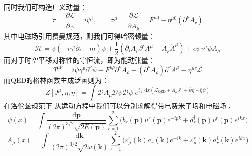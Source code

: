 同时我们可构造广义动量：
\begin{equation}
\pi=\frac{\partial\mathscr{L}}{\partial\dot{\psi}}=i\psi^\dagger,\qquad\pi^\mu=\frac{\partial\mathscr{L}}{\partial\dot{A}_\mu}=F^{\mu0}-\eta^{\mu0}(\partial^\nu A_\nu)
\end{equation}
其中电磁场引用费曼规范，则我们可得哈密顿量：
\begin{equation}
\mathscr{H}=\bar{\psi}(-i\gamma^i\partial_i+m)\psi+\frac{1}{2}(\partial_i A_\mu\partial^i A^\mu-\dot{A}_\mu\dot{A}^\mu)+e\bar{\psi}\gamma^\mu\psi A_\mu
\end{equation}
而对于时空平移对称性的守恒流，即为能动张量：
\begin{equation}
T^{\mu\nu}=i\bar{\psi}\gamma^\mu\partial^\nu\psi-F^{\mu\rho}\partial^\nu A_\rho-(\partial^\rho A_\rho)\partial^\nu A^\mu-\eta^{\mu\nu}\mathscr{L}
\end{equation}
而QED的格林函数生成泛函则为：
\begin{equation}
Z[J^\mu,\bar{\eta},\eta]=\int\mathcal{D}A_\mu\mathcal{D}\bar{\psi}\mathcal{D}\psi\;e^{i\int\mathrm{d}x(\mathscr{L}_{\text{QED}}+A_\mu J^\mu+\bar{\psi}\eta+\bar{\eta}\psi)}
\end{equation}
在洛伦兹规范下 从运动方程中我们可以分别求解得带电费米子场和电磁场：
\begin{equation}
\psi(x)=\int\frac{\mathrm{d}\boldsymbol{p}}{(2\pi)^{3/2}\sqrt{2E(\boldsymbol{p})}}\sum^2_{r=1}\Big(b_r(\boldsymbol{p})u^r(\boldsymbol{p})e^{-ipk}+d^\dagger_r(\boldsymbol{p})v^r(\boldsymbol{p})e^{ikx}\Big)
\end{equation}
\begin{equation}
A_\mu(x)=\int\frac{\mathrm{d}\boldsymbol{k}}{(2\pi)^{3/2}\sqrt{2\omega(\boldsymbol{k})}}\sum^2_{r=1}\Big(\varepsilon^r_\mu(\boldsymbol{k}) a_r(\boldsymbol{k})e^{-ik}+\varepsilon^r_\mu(\boldsymbol{k})a^\dagger_r(\boldsymbol{k})e^{ikx}\Big)
\end{equation}

